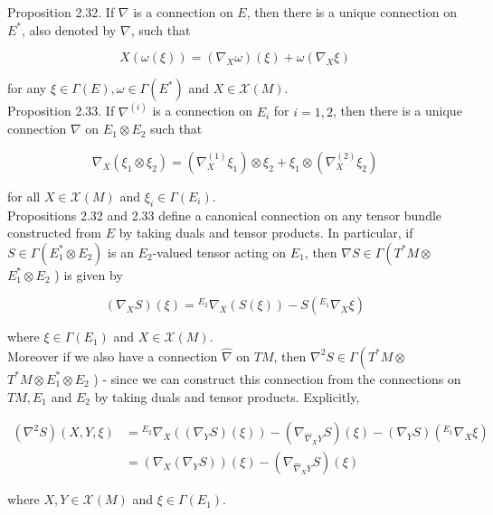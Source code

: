 \documentclass[10pt, letterpaper]{article}
\begin{document}
Proposition 2.32. If $\nabla$ is a connection on $E$, then there is a unique connection on $E^{*}$, also denoted by $\nabla$, such that

$$
X(\omega(\xi))=\left(\nabla_{X} \omega\right)(\xi)+\omega\left(\nabla_{X} \xi\right)
$$

for any $\xi \in \Gamma(E), \omega \in \Gamma\left(E^{*}\right)$ and $X \in \mathscr{X}(M)$.\\
Proposition 2.33. If $\nabla^{(i)}$ is a connection on $E_{i}$ for $i=1,2$, then there is a unique connection $\nabla$ on $E_{1} \otimes E_{2}$ such that

$$
\nabla_{X}\left(\xi_{1} \otimes \xi_{2}\right)=\left(\nabla_{X}^{(1)} \xi_{1}\right) \otimes \xi_{2}+\xi_{1} \otimes\left(\nabla_{X}^{(2)} \xi_{2}\right)
$$

for all $X \in \mathscr{X}(M)$ and $\xi_{i} \in \Gamma\left(E_{i}\right)$.\\
Propositions 2.32 and 2.33 define a canonical connection on any tensor bundle constructed from $E$ by taking duals and tensor products. In particular, if $S \in \Gamma\left(E_{1}^{*} \otimes E_{2}\right)$ is an $E_{2}$-valued tensor acting on $E_{1}$, then $\nabla S \in \Gamma\left(T^{*} M \otimes\right.$ $E_{1}^{*} \otimes E_{2}$ ) is given by

$$
\left(\nabla_{X} S\right)(\xi)={ }^{E_{2}} \nabla_{X}(S(\xi))-S\left({ }^{E_{1}} \nabla_{X} \xi\right)
$$

where $\xi \in \Gamma\left(E_{1}\right)$ and $X \in \mathscr{X}(M)$.\\
Moreover if we also have a connection $\widehat{\nabla}$ on $T M$, then $\nabla^{2} S \in \Gamma\left(T^{*} M \otimes\right.$ $T^{*} M \otimes E_{1}^{*} \otimes E_{2}$ ) - since we can construct this connection from the connections on $T M, E_{1}$ and $E_{2}$ by taking duals and tensor products. Explicitly,

$$
\begin{aligned}
\left(\nabla^{2} S\right)(X, Y, \xi) & ={ }^{E_{2}} \nabla_{X}\left(\left(\nabla_{Y} S\right)(\xi)\right)-\left(\nabla_{\widehat{\nabla}_{X} Y} S\right)(\xi)-\left(\nabla_{Y} S\right)\left({ }^{E_{1}} \nabla_{X} \xi\right) \\
& =\left(\nabla_{X}\left(\nabla_{Y} S\right)\right)(\xi)-\left(\nabla_{\widehat{\nabla}_{X} Y} S\right)(\xi)
\end{aligned}
$$

where $X, Y \in \mathscr{X}(M)$ and $\xi \in \Gamma\left(E_{1}\right)$.
\end{document}
